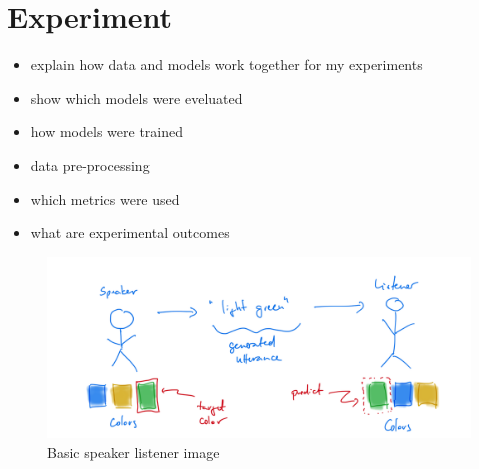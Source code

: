 \section{Experiment}

\begin{itemize}
  \item explain how data and models work together for my experiments
  \item show which models were eveluated
  \item how models were trained
  \item data pre-processing
  \item which metrics were used
  \item what are experimental outcomes
\end{itemize}

\begin{figure}[ht]
\centering
\includegraphics[scale=0.2]{assets/speaker_listener.pdf}
\caption[Speaker - Listener relation]
{Basic speaker listener image}
\label{overview}
\end{figure}